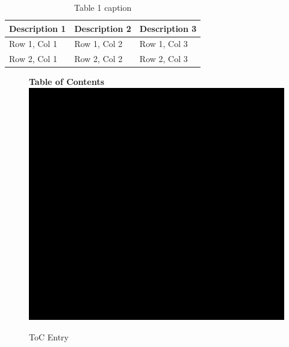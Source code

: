 \documentclass{WileyMSP-template}
\begin{document}
\begin{table}
 \caption{Table 1 caption}
  \begin{tabular}[htbp]{@{}lll@{}}
    \hline
    Description 1 & Description 2 & Description 3 \\
    \hline
    Row 1, Col 1  & Row 1, Col 2  & Row 1, Col 3  \\
    Row 2, Col 1  & Row 2, Col 2  & Row 2, Col 3  \\
    \hline
  \end{tabular}
\end{table}



\begin{figure}
\textbf{Table of Contents}\\
\medskip
  \includegraphics{toc-image.png}
  \medskip
  \caption*{ToC Entry}
\end{figure}
\end{document}
